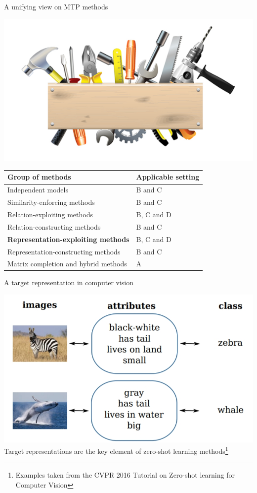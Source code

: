 \documentclass[]{beamer}
\renewcommand{\alert}[1]{\textbf{\color{putblue} #1}}
\begin{document}
\begin{frame}{A unifying view on MTP methods}

\begin{center}
\includegraphics[scale=0.3]{pics/tools}

\begin{tabular}{ll}
\hline
Group of methods & Applicable setting \\
\hline
\hline
Independent models & B and C \\
Similarity-enforcing methods & B and C   \\ 
Relation-exploiting methods & B, C and D  \\
Relation-constructing methods & B and C \\
\alert{Representation-exploiting methods} & B, C and D \\
Representation-constructing methods & B and C \\
Matrix completion and hybrid methods & A \\
\hline  
\end{tabular}
\end{center}
\end{frame}

\begin{frame}{A target representation in computer vision}

\begin{center}
\includegraphics[scale=0.4]{Figures/semanticclasses} \\
Target representations are the key element of zero-shot learning methods\footnote{Examples taken from the CVPR 2016 Tutorial on Zero-shot learning for Computer Vision} 
\end{center}

\end{frame}
\end{document}
